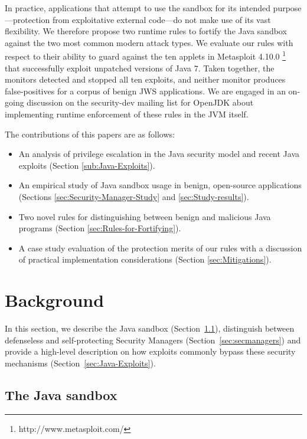 \documentclass{sig-alternate}
\begin{document}
In practice, applications that attempt to use the sandbox for its intended
purpose---protection from exploitative external code---do not make use of its
vast flexibility.  We therefore propose two runtime rules to fortify the Java
sandbox against the two most common modern attack types. We evaluate our rules
with respect to their ability to guard against the ten applets in Metasploit
4.10.0%
\footnote{http://www.metasploit.com/%
} that successfully exploit unpatched versions of Java 7. Taken together, the
monitors detected and stopped all ten exploits, and neither monitor produces
false-positives for a corpus of benign JWS applications.
We are engaged in an
on-going discussion on the security-dev mailing list for OpenJDK about
implementing runtime enforcement of these rules in the JVM itself.

The contributions of this papers are as follows:
\begin{itemize}
\item An analysis of privilege escalation in the Java security model and
recent Java exploits (Section \ref{sub:Java-Exploits}).
\item An empirical study of Java sandbox usage in benign, open-source applications
(Sections \ref{sec:Security-Manager-Study} and \ref{sec:Study-results}).
\item Two novel rules for distinguishing between benign and malicious Java
programs (Section \ref{sec:Rules-for-Fortifying}).
\item A case study evaluation of the protection merits of our rules with a discussion of practical implementation considerations (Section \ref{sec:Mitigations}).
\end{itemize}

\section{Background}\label{sec:Background}

In this section, we describe the Java sandbox
(Section~\ref{sec:sandbox}), distinguish between defenseless and self-protecting
Security Managers (Section~\ref{sec:secmanagers}) and provide a high-level
description on how exploits commonly bypass these security mechanisms
(Section~\ref{sec:Java-Exploits}). 

\subsection{The Java sandbox}
\label{sec:sandbox}
\end{document}
